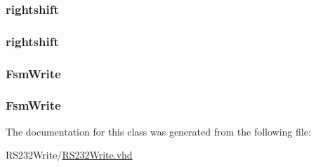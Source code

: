 \subsubsection[{u01}]{ {\bfseries \textcolor{vhdlchar}{rightshift}\textcolor{vhdlchar}{ }} \hspace{0.3cm}{\ttfamily [Instantiation]}}\label{class_r_s232_write_1_1moore_a261149681baa370af616d05085c60b21}
\hypertarget{class_r_s232_write_1_1moore_a261149681baa370af616d05085c60b21}{}
\subsubsection[{u01}]{ {\bfseries \textcolor{vhdlchar}{rightshift}\textcolor{vhdlchar}{ }} \hspace{0.3cm}{\ttfamily [Instantiation]}}\label{class_r_s232_write_1_1moore_a261149681baa370af616d05085c60b21}
\hypertarget{class_r_s232_write_1_1moore_a59af0c0173456dd2b8087a3882ac1a52}{}
\subsubsection[{u02}]{ {\bfseries \textcolor{vhdlchar}{Fsm\+Write}\textcolor{vhdlchar}{ }} \hspace{0.3cm}{\ttfamily [Instantiation]}}\label{class_r_s232_write_1_1moore_a59af0c0173456dd2b8087a3882ac1a52}
\hypertarget{class_r_s232_write_1_1moore_a59af0c0173456dd2b8087a3882ac1a52}{}
\subsubsection[{u02}]{ {\bfseries \textcolor{vhdlchar}{Fsm\+Write}\textcolor{vhdlchar}{ }} \hspace{0.3cm}{\ttfamily [Instantiation]}}\label{class_r_s232_write_1_1moore_a59af0c0173456dd2b8087a3882ac1a52}


The documentation for this class was generated from the following file\+:\begin{DoxyCompactItemize}
\item 
R\+S232\+Write/\hyperlink{_r_s232_write_8vhd}{R\+S232\+Write.\+vhd}\end{DoxyCompactItemize}

